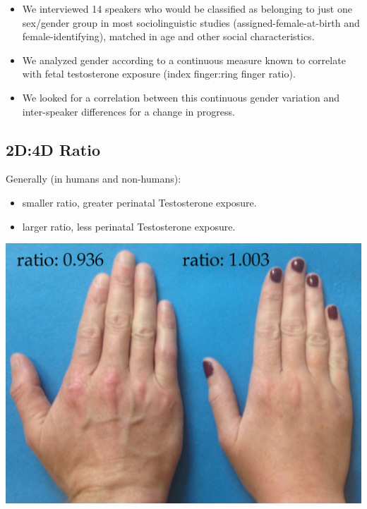\documentclass[a0,portrait]{a0poster}
\begin{document}
\begin{multicols}{2}
\begin{itemize}
	\item We interviewed 14 speakers who would be classified as belonging to just one sex/gender group in most sociolinguistic studies (assigned-female-at-birth and female-identifying), matched in age and other social characteristics.
	\item We analyzed gender according to a continuous measure known to correlate with fetal testosterone exposure (index finger:ring finger ratio).
	\item We looked for a correlation between this continuous gender variation and inter-speaker differences for a change in progress.
\end{itemize}

\subsection*{2D:4D Ratio}
Generally (in humans and non-humans):

\begin{itemize}
	\item smaller ratio, greater perinatal Testosterone exposure.
	\item larger ratio, less perinatal Testosterone exposure.
\end{itemize}
\begin{center}\vspace{1cm}
\includegraphics[width=0.6\linewidth]{realhands2.jpg}
\end{center}\vspace{1cm}



\end{multicols}
\end{document}
